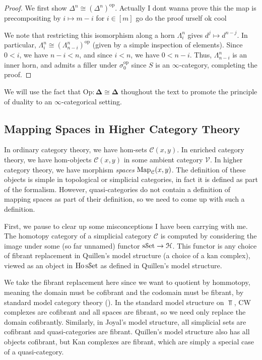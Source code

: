 \begin{proof}
	We first show $\Delta^n\cong(\Delta^n)^{\mathrm{op}} $. Actually I dont wanna prove this the map is precompositing by $i\mapsto m-i$ for $i\in[m]$ go do the proof urself ok cool

	We note that restricting this isomorphism along a horn $\Lambda_i^n$ gives $d^j\mapsto d^{n-j} $. In particular, $\Lambda_i^n\cong(\Lambda_{n-i} ^n)^{\mathrm{op}} $ (given by a simple inspection of elements). Since $0<i$, we have $n-i<n$, and since $i<n$, we have $0<n-i$. Thus, $\Lambda_{n-i}^n$ is an inner horn, and admits a filler under $\sigma_0^{\mathrm{op}} $ since $S$ is an $\infty $-category, completing the proof.
\end{proof}

We will use the fact that $\mathrm{Op} : \boldsymbol{\Delta}  \cong \boldsymbol{\Delta} $ thoughout the text to promote the principle of duality to an $\infty $-categorical setting.

\subsection{Mapping Spaces in Higher Category Theory}

In ordinary category theory, we have hom-sets $\mathcal{C} (x,y)$. In enriched category theory, we have hom-objects $\mathcal{C} (x,y)$ in some ambient category $\mathcal{V} $. In higher category theory, we have morphism \emph{spaces} $\operatorname{Map}_\mathcal{C} (x,y)$. The definition of these objects is simple in topological or simplicial categories, in fact it is defined as part of the formalism. However, quasi-categories do not contain a definition of mapping spaces as part of their definition, so we need to come up with such a definition.

First, we pause to clear up some misconceptions I have been carrying with me. The homotopy category of a simplicial category $\mathcal{C} $ is computed by considering the image under some (so far unnamed) functor $\mathrm{s}\mathcal{S}\mathrm{et} \to \mathcal{H} $. This functor is any choice of fibrant replacement in Quillen's model structure (a choice of a kan complex), viewed as an object in $\operatorname{Ho} \mathrm{s}\mathcal{S}\mathrm{et} $ as defined in Quillen's model structure.

We take the fibrant replacement here since we want to quotient by hommotopy, meaning the domain must be cofibrant and the codomain must be fibrant, by standard model category theory (\cite{hovey}). In the standard model structure on $\Top $, CW complexes are cofibrant and all spaces are fibrant, so we need only replace the domain cofibrantly. Similarly, in Joyal's model structure, all simplicial sets are cofibrant and quasi-categories are fibrant. Quillen's model structure also has all objects cofibrant, but Kan complexes are fibrant, which are simply a special case of a quasi-category.

